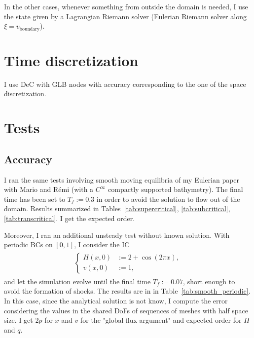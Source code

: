 \documentclass[english]{article}
\theoremstyle{thmstyleone}
\theoremstyle{thmstyletwo}
\theoremstyle{thmstylethree}
\begin{document}
In the other cases, whenever something from outside the domain is needed, I use the state given by a Lagrangian Riemann solver (Eulerian Riemann solver along $\xi=v_{\text{boundary}}$).



\section{Time discretization}
I use DeC with GLB nodes with accuracy corresponding to the one of the space discretization.

\section{Tests}


\subsection{Accuracy}

I ran the same tests involving smooth moving equilibria of my Eulerian paper~\cite{micalizzi2023novel} with Mario and Rémi (with a $C^\infty$ compactly supported bathymetry).
The final time has been set to $T_f:=0.3$ in order to avoid the solution to flow out of the domain.
%
Results summarized in Tables~\ref{tab:supercritical}, \ref{tab:subcritical}, \ref{tab:transcritical}. I get the expected order.

Moreover, I ran an additional unsteady test without known solution. With periodic BCs on $[0,1]$, I consider the IC
\begin{align}
	\begin{split}
		\begin{cases}
			H(x,0)&:=2+\cos{(2 \pi x)},\\
			v(x,0)&:=1,
		\end{cases}
	\end{split}
\end{align}
and let the simulation evolve until the final time $T_f:=0.07$, short enough to avoid the formation of shocks.
%
The results are in in Table~\ref{tab:smooth_periodic}.
%
In this case, since the analytical solution is not know, I compute the error considering the values in the shared DoFs of sequences of meshes with half space size.
%
I get $2p$ for $x$ and $v$ for the "global flux argument" and expected order for $H$ and $q$.




	
\end{document}
